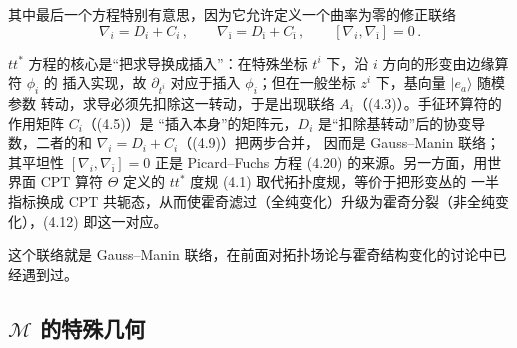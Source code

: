 其中最后一个方程特别有意思，因为它允许定义一个曲率为零的修正联络
\begin{equation}
  \nabla_i=D_i+C_i\,,\qquad
  \nabla_{\bar\imath}=D_{\bar\imath}+C_{\bar\imath}\,,\qquad
  [\nabla_i,\nabla_{\bar\imath}]=0\,.
  \tag{4.9}
  \label{eq:4.9}
\end{equation}

\begin{yizhu}[物理图像]
$tt^*$ 方程的核心是“把求导换成插入”：在特殊坐标 $t^i$ 下，沿 $i$ 方向的形变由边缘算符 $\phi_i$ 的
插入实现，故 $\partial_{t^i}$ 对应于插入 $\phi_i$；但在一般坐标 $z^i$ 下，基向量 $|e_a\rangle$ 随模参数
转动，求导必须先扣除这一转动，于是出现联络 $A_i$（(4.3)）。手征环算符的作用矩阵 $C_i$（(4.5)）是
“插入本身”的矩阵元，$D_i$ 是“扣除基转动”后的协变导数，二者的和 $\nabla_i=D_i+C_i$（(4.9)）把两步合并，
因而是 Gauss--Manin 联络；其平坦性 $[\nabla_i,\nabla_{\bar\imath}]=0$ 正是 Picard--Fuchs 方程 (4.20)
的来源。另一方面，用世界面 CPT 算符 $\Theta$ 定义的 $tt^*$ 度规 (4.1) 取代拓扑度规，等价于把形变丛的
一半指标换成 CPT 共轭态，从而使霍奇滤过（全纯变化）升级为霍奇分裂（非全纯变化），(4.12) 即这一对应。
\end{yizhu}

这个联络就是 Gauss--Manin 联络，在前面对拓扑场论与霍奇结构变化的讨论中已经遇到过。


\subsection{\texorpdfstring{$\mathcal{M}$}{M} 的特殊几何}
\label{sec:4.2}

